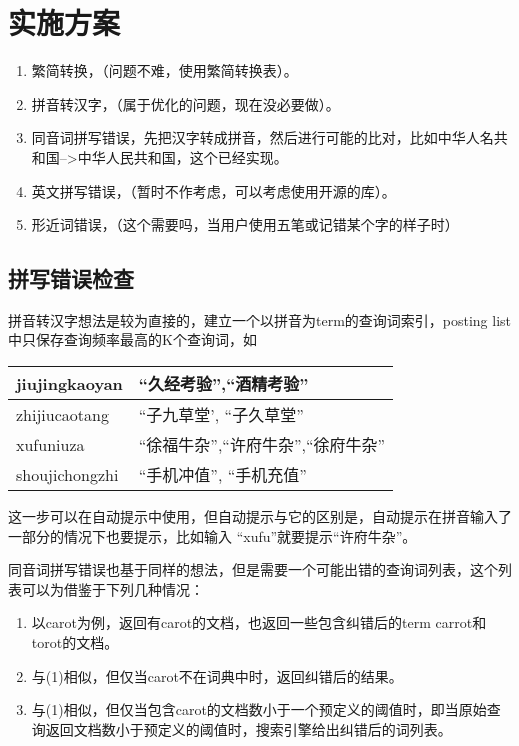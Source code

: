 \section{实施方案}
\begin{enumerate}[(1)]
\item 繁简转换，（问题不难，使用繁简转换表）。
\item 拼音转汉字，（属于优化的问题，现在没必要做）。
\item 同音词拼写错误，先把汉字转成拼音，然后进行可能的比对，比如中华人名共和国-->中华人民共和国，这个已经实现。
\item 英文拼写错误，（暂时不作考虑，可以考虑使用开源的库）。
\item 形近词错误，（这个需要吗，当用户使用五笔或记错某个字的样子时）
\end{enumerate}
\subsection{拼写错误检查}
\par 拼音转汉字想法是较为直接的，建立一个以拼音为term的查询词索引，posting list中只保存查询频率最高的K个查询词，如
\begin{table}[h]
  \centering
  \begin{tabular}{|l|l|}
\hline
jiujingkaoyan &“久经考验”,“酒精考验”\\ \hline
zhijiucaotang & “子九草堂', “子久草堂” \\ \hline
xufuniuza & “徐福牛杂”,“许府牛杂”,“徐府牛杂”\\ \hline
shoujichongzhi&“手机冲值”, “手机充值”\\ \hline
  \end{tabular}
\end{table}
\par 这一步可以在自动提示中使用，但自动提示与它的区别是，自动提示在拼音输入了一部分的情况下也要提示，比如输入 “xufu”就要提示“许府牛杂”。
\par 同音词拼写错误也基于同样的想法，但是需要一个可能出错的查询词列表，这个列表可以为借鉴于下列几种情况：
\begin{enumerate}[(1)]
\item 以carot为例，返回有carot的文档，也返回一些包含纠错后的term carrot和torot的文档。
\item 与(1)相似，但仅当carot不在词典中时，返回纠错后的结果。
\item 与(1)相似，但仅当包含carot的文档数小于一个预定义的阈值时，即当原始查询返回文档数小于预定义的阈值时，搜索引擎给出纠错后的词列表。
\end{enumerate}
